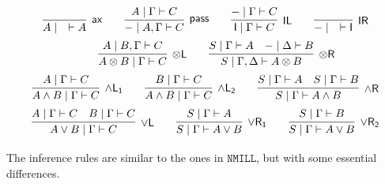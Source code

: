 \documentclass[submission,copyright,creativecommons]{eptcs}
\theoremstyle{definition}
\newcommand{\tl}{\otimes \mathsf{L}}
\newcommand{\tr}{\otimes \mathsf{R}}
\newcommand{\pass}{\mathsf{pass}}
\newcommand{\unitl}{\mathsf{IL}}
\newcommand{\unitr}{\mathsf{IR}}
\newcommand{\andlone}{\land \mathsf{L_{1}}}
\newcommand{\andltwo}{\land \mathsf{L_{2}}}
\newcommand{\andr}{\land \mathsf{R}}
\newcommand{\orl}{\lor \mathsf{L}}
\newcommand{\orrone}{\lor \mathsf{R_{1}}}
\newcommand{\orrtwo}{\lor \mathsf{R_{2}}}
\newcommand{\ax}{\mathsf{ax}}
\newcommand{\ot}{\otimes}
\newcommand{\I}{\mathsf{I}}
\newcommand{\NMILL}{$\mathtt{NMILL}$}
\begin{document}
\begin{equation}\label{eq:seqcalc}
  \def\arraystretch{2.5}
  \begin{array}{c}
    \infer[\ax]{A \mid \quad \vdash A}{}
    \qquad
    \infer[\pass]{{-} \mid A , \Gamma \vdash C}{A \mid \Gamma \vdash C}
    \qquad
    \infer[\unitl]{\I \mid \Gamma \vdash C}{{-} \mid \Gamma \vdash C}
    \qquad
    \infer[\unitr]{{-} \mid \quad \vdash \I}{}
    \\
    \qquad
    \infer[\tl]{A \ot B \mid \Gamma \vdash C}{A \mid B , \Gamma \vdash C}
    \qquad
    \infer[\tr]{S \mid \Gamma , \Delta \vdash A \ot B}{
      S \mid \Gamma \vdash A
      &
      {-} \mid \Delta \vdash B
    }
    \\
    \infer[\andlone]{A \land B \mid \Gamma \vdash C}{A \mid \Gamma \vdash C}
    \qquad
    \infer[\andltwo]{A \land B \mid \Gamma \vdash C}{B \mid \Gamma \vdash C}
    \qquad
    \infer[\andr]{S \mid \Gamma \vdash A \land B}{
      S \mid \Gamma \vdash A
      &
      S \mid \Gamma \vdash B
    }
    \\
    \infer[\orl]{A \lor B \mid \Gamma \vdash C}{
      A \mid \Gamma \vdash C
      &
      B \mid \Gamma \vdash C
    }
    \qquad
    \infer[\orrone]{S \mid \Gamma \vdash A \lor B}{S \mid \Gamma \vdash A}
    \qquad
    \infer[\orrtwo]{S \mid \Gamma \vdash A \lor B}{S \mid \Gamma \vdash B}
  \end{array}
\end{equation}
The inference rules are similar to the ones in \NMILL, but with some essential differences. 
\end{document}
